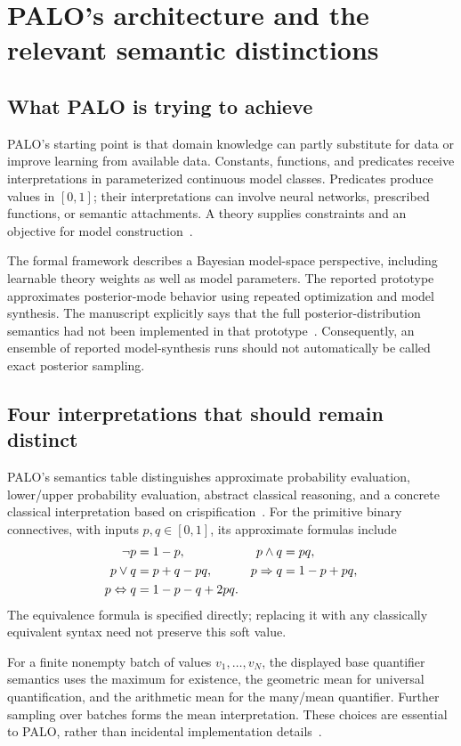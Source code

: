 \documentclass[11pt,a4paper]{article}
\theoremstyle{remark}
\begin{document}
\section{PALO's architecture and the relevant semantic distinctions}
\subsection{What PALO is trying to achieve}
PALO's starting point is that domain knowledge can partly substitute for data or improve learning from available data. Constants, functions, and predicates receive interpretations in parameterized continuous model classes. Predicates produce values in $[0,1]$; their interpretations can involve neural networks, prescribed functions, or semantic attachments. A theory supplies constraints and an objective for model construction~\cite[Sections 1, 3.1--3.4]{palo}.

The formal framework describes a Bayesian model-space perspective, including learnable theory weights as well as model parameters. The reported prototype approximates posterior-mode behavior using repeated optimization and model synthesis. The manuscript explicitly says that the full posterior-distribution semantics had not been implemented in that prototype~\cite[p.~28, note 29]{palo}. Consequently, an ensemble of reported model-synthesis runs should not automatically be called exact posterior sampling.

\subsection{Four interpretations that should remain distinct}
PALO's semantics table distinguishes approximate probability evaluation, lower/upper probability evaluation, abstract classical reasoning, and a concrete classical interpretation based on crispification~\cite[Sections 3.5--3.8, pp.~23--27]{palo}. For the primitive binary connectives, with inputs $p,q\in[0,1]$, its approximate formulas include
\begin{align}
 \neg p &= 1-p, & p\wedge q &= pq,\label{eq:palo-basic}\\
 p\vee q &= p+q-pq, & p\Rightarrow q &= 1-p+pq,\notag\\
 p\Leftrightarrow q &= 1-p-q+2pq.\notag
\end{align}
The equivalence formula is specified directly; replacing it with any classically equivalent syntax need not preserve this soft value.

For a finite nonempty batch of values $v_1,\ldots,v_N$, the displayed base quantifier semantics uses the maximum for existence, the geometric mean for universal quantification, and the arithmetic mean for the many/mean quantifier. Further sampling over batches forms the mean interpretation. These choices are essential to PALO, rather than incidental implementation details~\cite[Sections 3.2--3.3]{palo}.
\end{document}
